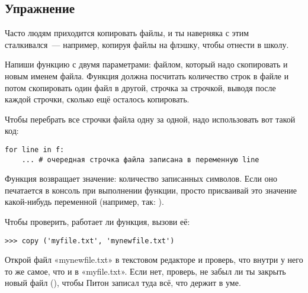 \subsection*{Упражнение}

Часто людям приходится копировать файлы, и ты наверняка с этим сталкивался — например, копируя файлы на флэшку, чтобы отнести в школу.

Напиши функцию  с двумя параметрами: файлом, который надо скопировать и новым именем файла.
Функция должна посчитать количество строк в файле и потом скопировать один файл в другой, строчка за строчкой, выводя после каждой строчки, сколько ещё осталось копировать.

Чтобы перебрать все строчки файла  одну за одной, надо использовать вот такой код:
\begin{listing}
\begin{verbatim}
for line in f:
	... # очередная строчка файла записана в переменную line
\end{verbatim}
\end{listing}

Функция  возвращает значение: количество записанных символов. Если оно печатается в консоль при выполнении функции, просто присваивай это значение какой-нибудь переменной (например, так: ).

Чтобы проверить, работает ли функция, вызови её:

\begin{listing}
\begin{verbatim}
>>> copy ('myfile.txt', 'mynewfile.txt')
\end{verbatim}
\end{listing}

Открой файл «mynewfile.txt» в текстовом редакторе и проверь, что внутри у него то же самое, что и в «myfile.txt». Если нет, проверь, не забыл ли ты закрыть новый файл (), чтобы Питон записал туда всё, что держит в уме.

\newpage